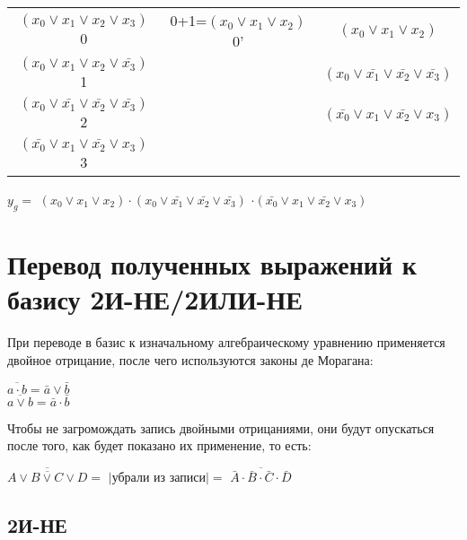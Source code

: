 \documentclass{bmstu}
\begin{document}
	\begin{center}
		\begin{tabular}{ |c|c|c| }
			\hline
$(x_0\vee x_1\vee x_2\vee x_3)$ 0				 &0+1=$(x_0\vee x_1\vee x_2)$ 0' &$(x_0 \vee x_1 \vee x_2 )$ 					\\
$(x_0\vee x_1\vee x_2\vee\bar{x_3})$ 1			 & 							     &$(x_0\vee\bar{x_1}\vee\bar{x_2}\vee\bar{x_3})$\\
$(x_0\vee\bar{x_1}\vee\bar{x_2}\vee\bar{x_3})$ 2 & 								 &$(\bar{x_0}\vee x_1\vee\bar{x_2}\vee x_3)$    \\
$(\bar{x_0}\vee x_1\vee\bar{x_2}\vee x_3)$ 3	 & 								 &   				   	    					\\
			\hline
		\end{tabular}
	\end{center}
	$y_g =$ $(x_0 \vee x_1 \vee x_2 ) \cdot $$(x_0\vee\bar{x_1}\vee\bar{x_2}\vee\bar{x_3})$ $\cdot(\bar{x_0}\vee x_1\vee\bar{x_2}\vee x_3)$

	\section{Перевод полученных выражений к базису 2И-НЕ/2ИЛИ-НЕ}
	При переводе в базис к изначальному алгебраическому уравнению применяется двойное отрицание, после чего используются законы де Морагана:
	
	\begin{center}
		$\overline{a \cdot b} = \bar{a} \vee \bar{b}$ \\
		$\overline{a \vee b} = \bar{a} \cdot \bar{b}$ \\
	\end{center}
	
	Чтобы не загромождать запись двойными отрицаниями, они будут опускаться после того, как будет показано их применение, то есть:
	
	\begin{center}
$\overline{\overline{A \vee B \vee C \vee D}} =$
$|\text{убрали из записи}| = $
$\overline{\bar{A} \cdot \bar{B} \cdot \bar{C} \cdot \bar{D}}$ 
	\end{center}

	\subsection{2И-НЕ}
	
\end{document}
